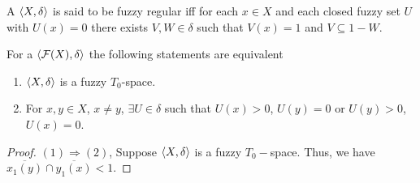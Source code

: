 \documentclass[../main-sheet.tex]{subfiles}
\begin{document}
\begin{defn}
    A \fts \s \(\langle X, \delta \rangle \) is said to be fuzzy regular iff for each \(x\in X \) and each closed  fuzzy set \(U \) with \(U(x)=0\) there exists \(V,W\in\delta\) such that \(V(x)=1\) and \(V\subseteq 1-W \).
\end{defn}
\begin{thm}
    For a \fts \(\langle \mathcal{F}(X), \delta \rangle\) the following statements are equivalent
    \begin{enumerate}
        \item \(\langle X, \delta \rangle\) is a fuzzy \(T_0 \)-space.
        \item For \(x,y\in X \), \(x\neq y \), \(\exists U\in \delta\) such that \(U(x)>0\), \(U(y)=0\) or \(U(y)>0\), \(U(x)=0\).
    \end{enumerate}
\end{thm}
\begin{proof}
    \((1)\Rightarrow(2)\), Suppose \(\langle X, \delta \rangle \) is a fuzzy \(T_0-\)space. Thus, we have \(\overline{x_1(y )}\cap \overline{y_1(x )}<1\).
\end{proof}
\end{document}
